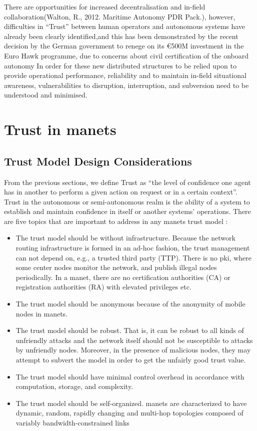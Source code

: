 There are opportunities for increased decentralisation and in-field collaboration(Walton, R., 2012. Maritime Autonomy PDR Pack.), however, difficulties in “Trust” between human operators and autonomous systems have already been clearly identified\cite{Chen2011b},and this has been demonstrated by the recent decision by the German government to renege on its €500M investment in the Euro Hawk programme, due to concerns about civil certification of the onboard autonomy\cite{Mehta2013}
In order for these new distributed structures to be relied upon to provide operational performance, reliability and to maintain in-field situational awareness, vulnerabilities to disruption, interruption, and subversion need to be understood and minimised.


\section{Trust in \glspl{manet}}

\subsection{Trust Model Design Considerations}

From the previous sections, we define Trust as ``the level of confidence one agent has in another to perform a given action on request or in a certain context''.
Trust in the autonomous or semi-autonomous realm is the ability of a system to establish and maintain confidence in itself or another systems' operations.
There are five topics that are important to address in any \gls{manet}s trust model \cite{Kamvar2003}:
%
\begin{itemize}
  \item The trust model should be without infrastructure.
    Because the network routing infrastructure is formed in an ad-hoc fashion, the trust management can not depend on, e.g., a trusted third party (TTP).
    There is no \gls{pki}, where some center nodes monitor the network, and publish illegal nodes periodically.
    In a \gls{manet}, there are no certification authorities (CA) or registration authorities (RA) with elevated privileges etc.
  \item The trust model should be anonymous because of the anonymity of mobile nodes in \gls{manet}s.
  \item The trust model should be robust.
    That is, it can be robust to all kinds of unfriendly attacks and the network itself should not be susceptible to attacks by unfriendly nodes.
    Moreover, in the presence of malicious nodes, they may attempt to subvert the model in order to get the unfairly good trust value.
  \item The trust model should have minimal control overhead in accordance with computation, storage, and complexity.
  \item The trust model should be self-organized.
    \glspl{manet} are characterized to have dynamic, random, rapidly changing and multi-hop topologies composed of variably bandwidth-constrained links
\end{itemize}
%

